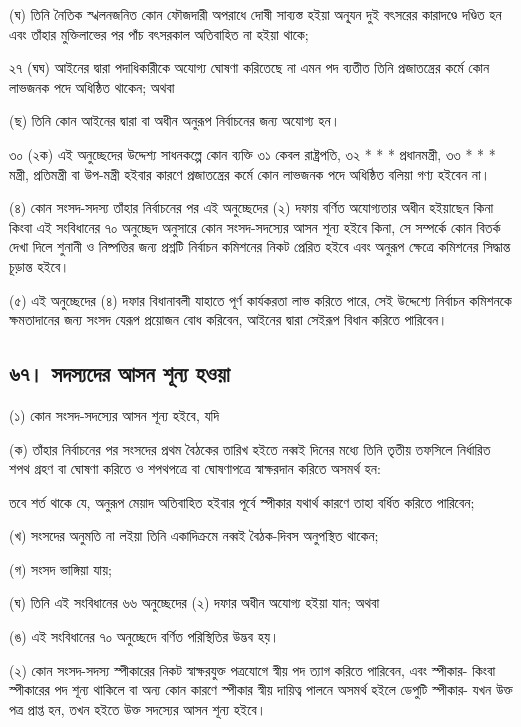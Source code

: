 \documentclass[11pt]{article}
\begin{document}
(ঘ) তিনি নৈতিক স্খলনজনিত কোন ফৌজদারী অপরাধে দোষী সাব্যস্ত হইয়া অনূ্যন দুই
    বৎসরের কারাদণ্ডে দণ্ডিত হন এবং তাঁহার মুক্তিলাভের পর পাঁচ বৎসরকাল অতিবাহিত
    না হইয়া থাকে;

২৭ (ঘঘ) আইনের দ্বারা পদাধিকারীকে অযোগ্য ঘোষণা করিতেছে না এমন পদ ব্যতীত
তিনি প্রজাতন্ত্রের কর্মে কোন লাভজনক পদে অধিষ্ঠিত থাকেন; অথবা


(ছ) তিনি কোন আইনের দ্বারা বা অধীন অনুরূপ নির্বাচনের জন্য অযোগ্য হন।

৩০ (২ক) এই অনুচ্ছেদের উদ্দেশ্য সাধনকল্পে কোন ব্যক্তি ৩১ কেবল রাষ্ট্রপতি,
৩২ * * * প্রধানমন্ত্রী, ৩৩ * * * মন্ত্রী, প্রতিমন্ত্রী বা উপ-মন্ত্রী হইবার কারণে
প্রজাতন্ত্রের কর্মে কোন লাভজনক পদে অধিষ্ঠিত বলিয়া গণ্য হইবেন না।

(৪) কোন সংসদ-সদস্য তাঁহার নির্বাচনের পর এই অনুচ্ছেদের (২) দফায় বর্ণিত
    অযোগ্যতার অধীন হইয়াছেন কিনা কিংবা এই সংবিধানের ৭০ অনুচ্ছেদ অনুসারে কোন
    সংসদ-সদস্যের আসন শূন্য হইবে কিনা, সে সম্পর্কে কোন বিতর্ক দেখা দিলে শুনানী ও
    নিষ্পত্তির জন্য প্রশ্নটি নির্বাচন কমিশনের নিকট প্রেরিত হইবে এবং অনুরূপ ক্ষেত্রে
    কমিশনের সিদ্ধান্ত চূড়ান্ত হইবে।

(৫) এই অনুচ্ছেদের (৪) দফার বিধানাবলী যাহাতে পূর্ণ কার্যকরতা লাভ করিতে পারে,
    সেই উদ্দেশ্যে নির্বাচন কমিশনকে ক্ষমতাদানের জন্য সংসদ যেরূপ প্রয়োজন বোধ
    করিবেন, আইনের দ্বারা সেইরূপ বিধান করিতে পারিবেন।

\subsection{৬৭। সদস্যদের আসন শূন্য হওয়া}
\label{sec:org1746242}
(১) কোন সংসদ-সদস্যের আসন শূন্য হইবে, যদি

(ক) তাঁহার নির্বাচনের পর সংসদের প্রথম বৈঠকের তারিখ হইতে নব্বই দিনের মধ্যে
    তিনি তৃতীয় তফসিলে নির্ধারিত শপথ গ্রহণ বা ঘোষণা করিতে ও শপথপত্রে বা
    ঘোষণাপত্রে স্বাক্ষরদান করিতে অসমর্থ হন:

তবে শর্ত থাকে যে, অনুরূপ মেয়াদ অতিবাহিত হইবার পূর্বে স্পীকার যথার্থ কারণে
তাহা বর্ধিত করিতে পারিবেন;

(খ) সংসদের অনুমতি না লইয়া তিনি একাদিক্রমে নব্বই বৈঠক-দিবস অনুপস্থিত থাকেন;

(গ) সংসদ ভাঙ্গিয়া যায়;

(ঘ) তিনি এই সংবিধানের ৬৬ অনুচ্ছেদের (২) দফার অধীন অযোগ্য হইয়া যান; অথবা

(ঙ) এই সংবিধানের ৭০ অনুচ্ছেদে বর্ণিত পরিস্থিতির উদ্ভব হয়।

(২) কোন সংসদ-সদস্য স্পীকারের নিকট স্বাক্ষরযুক্ত পত্রযোগে স্বীয় পদ ত্যাগ করিতে
    পারিবেন, এবং স্পীকার- কিংবা স্পীকারের পদ শূন্য থাকিলে বা অন্য কোন কারণে
    স্পীকার স্বীয় দায়িত্ব পালনে অসমর্থ হইলে ডেপুটি স্পীকার- যখন উক্ত পত্র প্রাপ্ত
    হন, তখন হইতে উক্ত সদস্যের আসন শূন্য হইবে।
\end{document}
